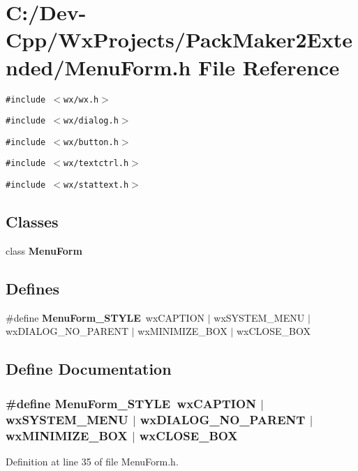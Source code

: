 \section{C:/Dev-Cpp/Wx\-Projects/Pack\-Maker2Extended/Menu\-Form.h File Reference}
\label{_menu_form_8h}
{\tt \#include $<$wx/wx.h$>$}\par
{\tt \#include $<$wx/dialog.h$>$}\par
{\tt \#include $<$wx/button.h$>$}\par
{\tt \#include $<$wx/textctrl.h$>$}\par
{\tt \#include $<$wx/stattext.h$>$}\par
\subsection*{Classes}
\begin{CompactItemize}
\item 
class {\bf Menu\-Form}
\end{CompactItemize}
\subsection*{Defines}
\begin{CompactItemize}
\item 
\#define {\bf Menu\-Form\_\-STYLE}~wx\-CAPTION $|$ wx\-SYSTEM\_\-MENU $|$ wx\-DIALOG\_\-NO\_\-PARENT $|$ wx\-MINIMIZE\_\-BOX $|$ wx\-CLOSE\_\-BOX
\end{CompactItemize}


\subsection{Define Documentation}
\subsubsection{\setlength{\rightskip}{0pt plus 5cm}\#define Menu\-Form\_\-STYLE~wx\-CAPTION $|$ wx\-SYSTEM\_\-MENU $|$ wx\-DIALOG\_\-NO\_\-PARENT $|$ wx\-MINIMIZE\_\-BOX $|$ wx\-CLOSE\_\-BOX}\label{_menu_form_8h_d1c93e58f00d338bbc74e6665b0bd184}




Definition at line 35 of file Menu\-Form.h.